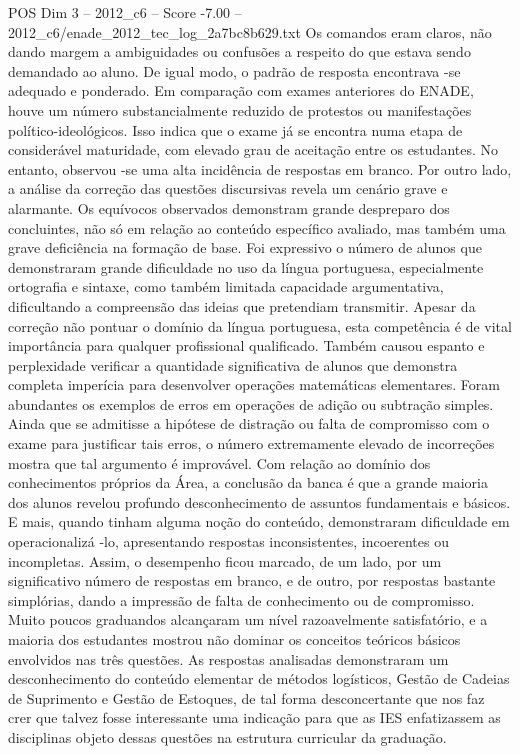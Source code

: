 \begin{textsample}{POS Dim 3 – 2012\_c6 – Score -7.00 – 2012\_c6/enade\_2012\_tec\_log\_2a7bc8b629.txt}
Os comandos eram claros, não dando margem a ambiguidades ou confusões a respeito do que estava sendo demandado ao aluno.
De igual modo, o padrão de resposta encontrava -se adequado e ponderado.
Em comparação com exames anteriores do ENADE, houve um número substancialmente reduzido de protestos ou manifestações político-ideológicos.
Isso indica que o exame já se encontra numa etapa de considerável maturidade, com elevado grau de aceitação entre os estudantes.
No entanto, observou -se uma alta incidência de respostas em branco.
Por outro lado, a análise da correção das questões discursivas revela um cenário grave e alarmante.
Os equívocos observados demonstram grande despreparo dos concluintes, não só em relação ao conteúdo específico avaliado, mas também uma grave deficiência na formação de base.
Foi expressivo o número de alunos que demonstraram grande dificuldade no uso da língua portuguesa, especialmente ortografia e sintaxe, como também limitada capacidade argumentativa, dificultando a compreensão das ideias que pretendiam transmitir.
Apesar da correção não pontuar o domínio da língua portuguesa, esta competência é de vital importância para qualquer profissional qualificado.
Também causou espanto e perplexidade verificar a quantidade significativa de alunos que demonstra completa imperícia para desenvolver operações matemáticas elementares.
Foram abundantes os exemplos de erros em operações de adição ou subtração simples.
Ainda que se admitisse a hipótese de distração ou falta de compromisso com o exame para justificar tais erros, o número extremamente elevado de incorreções mostra que tal argumento é improvável.
Com relação ao domínio dos conhecimentos próprios da Área, a conclusão da banca é que a grande maioria dos alunos revelou profundo desconhecimento de assuntos fundamentais e básicos.
E mais, quando tinham alguma noção do conteúdo, demonstraram dificuldade em operacionalizá -lo, apresentando respostas inconsistentes, incoerentes ou incompletas.
Assim, o desempenho ficou marcado, de um lado, por um significativo número de respostas em branco, e de outro, por respostas bastante simplórias, dando a impressão de falta de conhecimento ou de compromisso.
Muito poucos graduandos alcançaram um nível razoavelmente satisfatório, e a maioria dos estudantes mostrou não dominar os conceitos teóricos básicos envolvidos nas três questões.
As respostas analisadas demonstraram um desconhecimento do conteúdo elementar de métodos logísticos, Gestão de Cadeias de Suprimento e Gestão de Estoques, de tal forma desconcertante que nos faz crer que talvez fosse interessante uma indicação para que as IES enfatizassem as disciplinas objeto dessas questões na estrutura curricular da graduação.

\end{textsample}
